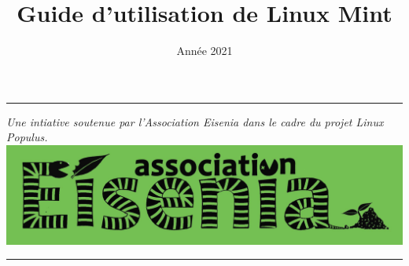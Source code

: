 \documentclass[12pt]{article}
\title{\textbf{Guide d'utilisation de Linux Mint}}
\date{Année 2021}
\begin{document}
	\maketitle
	\vfill
	\hrule
	\vspace*{.3cm}
	\hspace{-.45cm}
	{\em Une intiative soutenue par l'Association Eisenia dans le cadre du projet Linux Populus.}\newline
	\includegraphics[width=\textwidth]{../include/logo.jpg}\\
	\vspace*{-.2cm}
	\hrule
\end{document}
